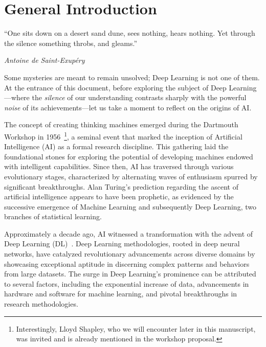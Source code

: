 \chapter{General Introduction}
\label{chap:intro}

\epigraph{``One sits down on a desert sand dune, sees nothing, hears nothing. Yet through the silence something throbs, and gleams.''}{\textit{Antoine de Saint-Exupéry}}

Some mysteries are meant to remain unsolved; Deep Learning is not one of them. At the entrance of this document, before exploring the subject of Deep Learning—where the \textit{silence} of our understanding contrasts sharply with the powerful \textit{noise} of its achievements—let us take a moment to reflect on the origins of AI.

The concept of creating thinking machines emerged during the Dartmouth Workshop in 1956~\cite{mccarthy2006proposal}\footnote{Interestingly, Lloyd Shapley, who we will encounter later in this manuscript, was invited and is already mentioned in the workshop proposal.}, a seminal event that marked the inception of Artificial Intelligence (AI) as a formal research discipline. This gathering laid the foundational stones for exploring the potential of developing machines endowed with intelligent capabilities. Since then, AI has traversed through various evolutionary stages, characterized by alternating waves of enthusiasm spurred by significant breakthroughs. Alan Turing's prediction regarding the ascent of artificial intelligence appears to have been prophetic, as evidenced by the successive emergence of Machine Learning and subsequently Deep Learning, two branches of statistical learning.

Approximately a decade ago, AI witnessed a transformation with the advent of Deep Learning (DL)~\cite{lecun2015deep,Serre2019DeepLT}. Deep Learning methodologies, rooted in deep neural networks, have catalyzed revolutionary advancements across diverse domains by showcasing exceptional aptitude in discerning complex patterns and behaviors from large datasets. The surge in Deep Learning's prominence can be attributed to several factors, including the exponential increase of data, advancements in hardware and software for machine learning, and pivotal breakthroughs in research methodologies.

